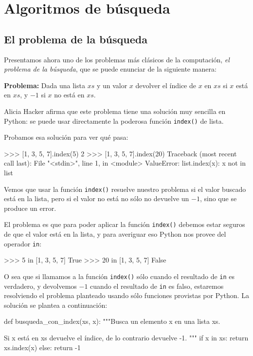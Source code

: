 \chapter[Algoritmos de búsqueda]{Algoritmos de búsqueda}

\section{El problema de la búsqueda}

Presentamos ahora uno de los problemas más clásicos de la computación, {\it el
problema de la búsqueda}, que se puede enunciar de la siguiente manera:

{\bf Problema: } Dada una lista $xs$ y un valor $x$ devolver el índice de $x$
en $xs$ si $x$ está en $xs$, y $-1$ si $x$ no está en $xs$.

Alicia Hacker afirma que este problema tiene una solución muy sencilla en
Python: se puede usar directamente la poderosa función \lstinline+index()+ de
lista.

Probamos esa solución para ver qué pasa:

\begin{codigo-python-sn}
>>> [1, 3, 5, 7].index(5)
2
>>> [1, 3, 5, 7].index(20)
Traceback (most recent call last):
  File "<stdin>", line 1, in <module>
ValueError: list.index(x): x not in list
\end{codigo-python-sn}

Vemos que usar la función \lstinline+index()+ resuelve nuestro problema si el
valor buscado está en la lista, pero si el valor no está no sólo no devuelve
un $-1$, sino que se produce un error.

El problema es que para poder aplicar la función \lstinline+index()+ debemos
estar seguros de que el valor está en la lista, y para averiguar eso Python
nos provee del operador \lstinline+in+:

\begin{codigo-python-sn}
>>> 5 in [1, 3, 5, 7]
True
>>> 20 in [1, 3, 5, 7]
False
\end{codigo-python-sn}

O sea que si llamamos a la función \lstinline+index()+ sólo cuando el
resultado de \lstinline+in+ es verdadero, y devolvemos $-1$ cuando el
resultado de \lstinline+in+ es falso, estaremos resolviendo el problema
planteado usando sólo funciones provistas por Python. La solución se plantea a
continuación:

\begin{codigo-python-sn}
def busqueda_con_index(xs, x):
    """Busca un elemento x en una lista xs.

    Si x está en xs devuelve el índice,
    de lo contrario devuelve -1.
    """
    if x in xs:
        return xs.index(x)
    else:
        return -1
\end{codigo-python-sn}

